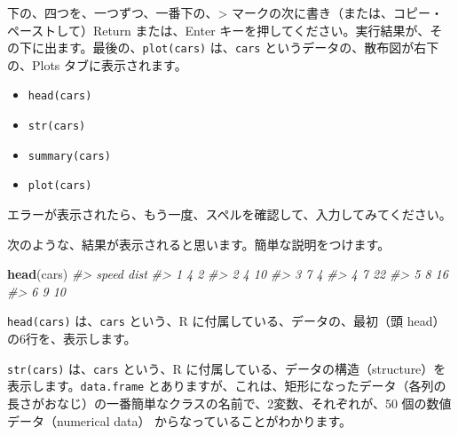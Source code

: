 \documentclass[
  xelatex, ja=standard]{bxjsbook}
\newenvironment{Shaded}{\begin{snugshade}}{\end{snugshade}}
\newcommand{\CommentTok}[1]{\textcolor[rgb]{0.56,0.35,0.01}{\textit{#1}}}
\newcommand{\FunctionTok}[1]{\textcolor[rgb]{0.13,0.29,0.53}{\textbf{#1}}}
\newcommand{\NormalTok}[1]{#1}
\providecommand{\tightlist}{%
  \setlength{\itemsep}{0pt}\setlength{\parskip}{0pt}}
\theoremstyle{definition}
\theoremstyle{definition}
\theoremstyle{definition}
\theoremstyle{definition}
\theoremstyle{remark}
\begin{document}
下の、四つを、一つずつ、一番下の、\textgreater{} マークの次に書き（または、コピー・ペーストして）Return または、Enter キーを押してください。実行結果が、その下に出ます。最後の、\texttt{plot(cars)} は、\texttt{cars} というデータの、散布図が右下の、Plots タブに表示されます。

\begin{itemize}
\tightlist
\item
  \texttt{head(cars)}
\item
  \texttt{str(cars)}
\item
  \texttt{summary(cars)}
\item
  \texttt{plot(cars)}
\end{itemize}

エラーが表示されたら、もう一度、スペルを確認して、入力してみてください。

次のような、結果が表示されると思います。簡単な説明をつけます。

\begin{Shaded}
\begin{Highlighting}[]
\FunctionTok{head}\NormalTok{(cars)}
\CommentTok{\#\textgreater{}   speed dist}
\CommentTok{\#\textgreater{} 1     4    2}
\CommentTok{\#\textgreater{} 2     4   10}
\CommentTok{\#\textgreater{} 3     7    4}
\CommentTok{\#\textgreater{} 4     7   22}
\CommentTok{\#\textgreater{} 5     8   16}
\CommentTok{\#\textgreater{} 6     9   10}
\end{Highlighting}
\end{Shaded}

\texttt{head(cars)} は、\texttt{cars} という、R に付属している、データの、最初（頭 head）の6行を、表示します。

\begin{Shaded}
\end{Shaded}

\texttt{str(cars)} は、\texttt{cars} という、R に付属している、データの構造（structure）を表示します。\texttt{data.frame} とありますが、これは、矩形になったデータ（各列の長さがおなじ）の一番簡単なクラスの名前で、2変数、それぞれが、50 個の数値データ（numerical data） からなっていることがわかります。
\end{document}
